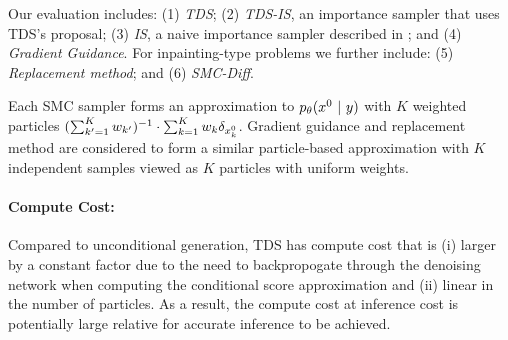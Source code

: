 Our evaluation includes:
(1) \textit{TDS}; (2) \textit{TDS-IS},  an importance sampler that uses TDS's proposal; %
(3) \textit{IS}, a naive importance sampler described in ;  and
(4) \textit{Gradient Guidance}. %
For inpainting-type problems we further include: (5) \textit{Replacement method}; and (6) \textit{SMC-Diff}. %

Each SMC sampler forms an approximation to $p_{\theta}(x^{0} ~\vert~ y)$ with $K$ weighted particles $(\sum_{k^\prime=1}^K w_{k^\prime})^{-1} \cdot \sum_{k=1}^K w_k \delta_{x^{0}_k}$. 
Gradient guidance and replacement method are considered to form a similar particle-based approximation with $K$ independent samples viewed as $K$ particles with uniform weights. 

\paragraph{Compute Cost:} %
Compared to unconditional generation, TDS has compute cost that is 
(i) larger by a constant factor due to the need to backpropogate through the denoising network when computing the conditional score approximation and
(ii) linear in the number of particles.
As a result, the compute cost at inference cost is potentially large relative for accurate inference to be achieved.

